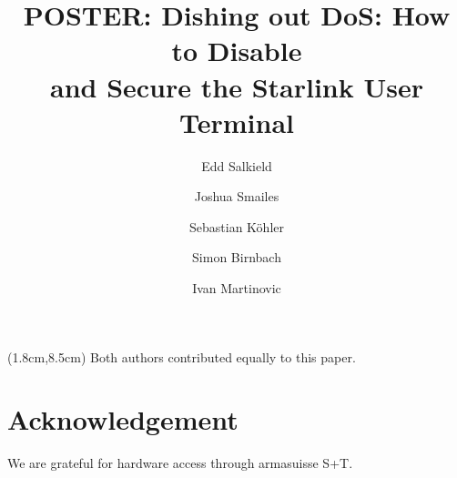 \documentclass[sigconf,natbib=false]{acmart}
\begin{document}
\title{POSTER: Dishing out DoS: How to Disable\\and Secure the Starlink User Terminal}

\author{Edd Salkield}
\authornotemark[2]

\author{Joshua Smailes}
\authornotemark[2]

\author{Sebastian K{\"o}hler}

\author{Simon Birnbach}

\author{Ivan Martinovic}



\maketitle

\begin{textblock*}{7cm}(1.8cm,8.5cm)
  \small{\textdagger\;Both authors contributed equally to this paper.}
\end{textblock*}

\vspace{-1em}





\section*{Acknowledgement}\label{sec:acknowledgements}

We are grateful for hardware access through armasuisse S+T.

\printbibliography
\end{document}
